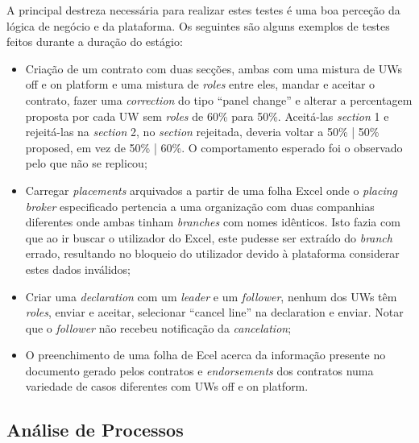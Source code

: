         A principal destreza necessária para realizar estes testes é uma boa perceção da lógica de negócio e da plataforma. Os seguintes são alguns exemplos de testes feitos durante a duração do estágio:

        \begin{itemize}
            \item Criação de um contrato com duas secções, ambas com uma mistura de UWs off e on platform e uma mistura de \textit{roles} entre eles, mandar e aceitar o contrato, fazer uma \textit{correction} do tipo ``panel change'' e alterar a percentagem proposta por cada UW sem \textit{roles} de 60\% para 50\%. Aceitá-las \textit{section} 1 e rejeitá-las na \textit{section} 2, no \textit{section} rejeitada, deveria voltar a 50\% | 50\% proposed, em vez de 50\% | 60\%. O comportamento esperado foi o observado pelo que não se replicou;
            \item Carregar \textit{placements} arquivados a partir de uma folha Excel onde o \textit{placing broker} especificado pertencia a uma organização com duas companhias diferentes onde ambas tinham \textit{branches} com nomes idênticos. Isto fazia com que ao ir buscar o utilizador do Excel, este pudesse ser extraído do \textit{branch} errado, resultando no bloqueio do utilizador devido à plataforma considerar estes dados inválidos;
            \item Criar uma \textit{declaration} com um \textit{leader} e um \textit{follower}, nenhum dos UWs têm \textit{roles}, enviar e aceitar, selecionar ``cancel line'' na declaration e enviar. Notar que o \textit{follower} não recebeu notificação da \textit{cancelation};
            \item O preenchimento de uma folha de Ecel acerca da informação presente no documento gerado pelos contratos e \textit{endorsements} dos contratos numa variedade de casos diferentes com UWs off e on platform.
        \end{itemize}

    \subsection{Análise de Processos}\label{sub:processos}

